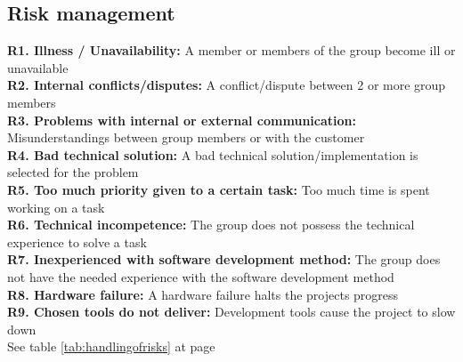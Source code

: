 



\subsection{Risk management}

\textbf{R1. Illness / Unavailability:} A member or members of the group become ill or unavailable \\
\textbf{R2. Internal conflicts/disputes:} A conflict/dispute between 2 or more group members \\
\textbf{R3. Problems with internal or external communication:} Misunderstandings between group members or with the customer \\
\textbf{R4. Bad technical solution:} A bad technical solution/implementation is selected for the problem \\
\textbf{R5. Too much priority given to a certain task:} Too much time is spent working on a task \\
\textbf{R6. Technical incompetence:} The group does not possess the technical experience to solve a task \\
\textbf{R7. Inexperienced with software development method:} The group does not have the needed experience with the software development method \\
\textbf{R8. Hardware failure:} A hardware failure halts the projects progress \\
\textbf{R9. Chosen tools do not deliver:} Development tools cause the project to slow down \\
\newline
\newline
See table \ref{tab:handlingofrisks} at page \pageref{tab:handlingofrisks}
\newline
\newline
